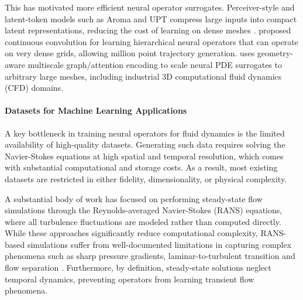 \documentclass{article}
\begin{document}
This has motivated more efficient neural operator surrogates. Perceiver-style and latent-token models such as Aroma and UPT compress large inputs into compact latent representations, reducing the cost of learning on dense meshes \citep{aroma2024,Alkin2024}. \citet{calmpde, koupai2025efficientgenerativetransformeroperators} proposed continuous convolution for learning hierarchical neural operators that can operate on very dense grids, allowing million point trajectory generation. \citet{wen2025goat} uses geometry-aware multiscale graph/attention encoding to scale neural PDE surrogates to arbitrary large meshes, including industrial 3D computational fluid dynamics (CFD) domains.


\paragraph{Datasets for Machine Learning Applications}
A key bottleneck in training neural operators for fluid dynamics is the limited availability of high-quality datasets. Generating such data requires solving the Navier-Stokes equations at high spatial and temporal resolution, which comes with substantial computational and storage costs. As a result, most existing datasets are restricted in either fidelity, dimensionality, or physical complexity.

A substantial body of work \citep{airfrans2023, BlendedNet2025, drivaernet2025, unifoil2025, emmiwing2025} has focused on performing steady-state flow simulations through the Reynolds-averaged Navier-Stokes (RANS) equations, where all turbulence fluctuations are modeled rather than computed directly. While these approaches significantly reduce computational complexity, RANS-based simulations suffer from well-documented limitations in capturing complex phenomena such as sharp pressure gradients, laminar-to-turbulent transition and flow separation \citep{wilcox1998turbulence}. Furthermore, by definition, steady-state solutions neglect temporal dynamics, preventing operators from learning transient flow phenomena.
\end{document}
